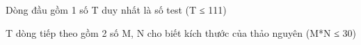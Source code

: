 Dòng đầu gồm 1 số T duy nhất là số test (T ≤ 111)  

   T dòng tiếp theo gồm 2 số M, N cho biết kích thước của thảo nguyên (M*N ≤ 30)